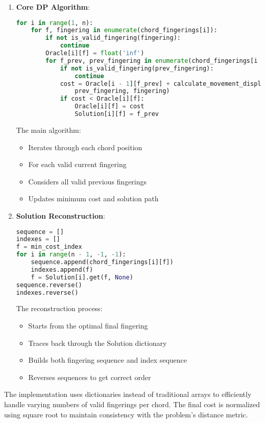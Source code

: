 \documentclass[conference]{IEEEtran}
\begin{document}
\begin{enumerate}
\item \textbf{Core DP Algorithm}:
\begin{lstlisting}[language=Python]
for i in range(1, n):
    for f, fingering in enumerate(chord_fingerings[i]):
        if not is_valid_fingering(fingering):
            continue
        Oracle[i][f] = float('inf')
        for f_prev, prev_fingering in enumerate(chord_fingerings[i - 1]):
            if not is_valid_fingering(prev_fingering):
                continue
            cost = Oracle[i - 1][f_prev] + calculate_movement_displacement(
                prev_fingering, fingering)
            if cost < Oracle[i][f]:
                Oracle[i][f] = cost
                Solution[i][f] = f_prev
\end{lstlisting}
The main algorithm:
\begin{itemize}
    \item Iterates through each chord position
    \item For each valid current fingering
    \item Considers all valid previous fingerings
    \item Updates minimum cost and solution path
\end{itemize}

\item \textbf{Solution Reconstruction}:
\begin{lstlisting}[language=Python]
sequence = []
indexes = []
f = min_cost_index
for i in range(n - 1, -1, -1):
    sequence.append(chord_fingerings[i][f])
    indexes.append(f)
    f = Solution[i].get(f, None)
sequence.reverse()
indexes.reverse()
\end{lstlisting}
The reconstruction process:
\begin{itemize}
    \item Starts from the optimal final fingering
    \item Traces back through the Solution dictionary
    \item Builds both fingering sequence and index sequence
    \item Reverses sequences to get correct order
\end{itemize}
\end{enumerate}

The implementation uses dictionaries instead of traditional arrays to efficiently handle varying numbers of valid fingerings per chord. The final cost is normalized using square root to maintain consistency with the problem's distance metric.
\end{document}

